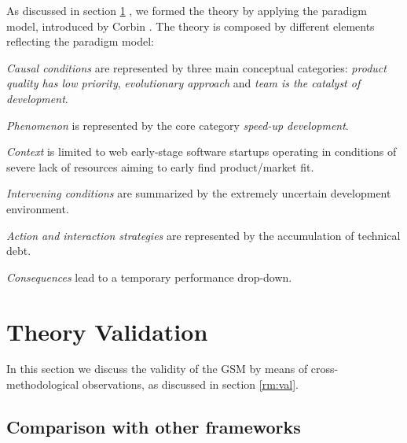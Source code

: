 \documentclass[10pt,journal,letterpaper,compsoc]{IEEEtran}
\begin{document}
As discussed in section \ref{res:val} %
, we formed the theory by applying the paradigm model, introduced by Corbin 
\cite{Corbin1990}. The theory is composed by different elements reflecting the 
paradigm model:

\begin{compactitem}

\item \textit{Causal conditions} are represented by three main conceptual 
categories: \textit{product quality has low priority}, \textit{evolutionary 
approach} and \textit{team is the catalyst of development}.
\item \textit{Phenomenon} is represented by the core category \textit{speed-up 
development}.
\item \textit{Context} is limited to web early-stage software startups 
operating in conditions of severe lack of resources aiming to early find 
product/market fit.
\item \textit{Intervening conditions} are  summarized by the extremely 
uncertain development environment.
\item \textit{Action and interaction strategies} are represented by the 
accumulation of technical debt.
\item \textit{Consequences} lead to a temporary performance drop-down.
\end{compactitem}

\section{Theory Validation}
\label{res:val}

In this section we discuss the validity of the GSM by means of 
cross-methodological observations, as discussed in section \ref{rm:val}.


\subsection{Comparison with other frameworks}
\label{sect:theory:validation:others}
\end{document}
